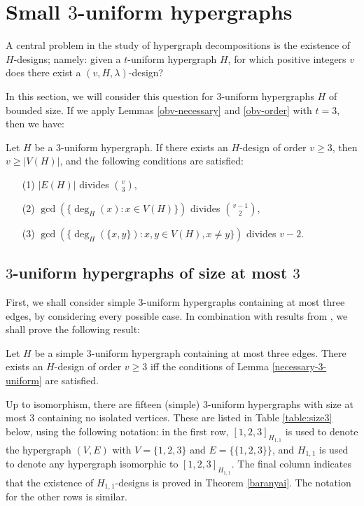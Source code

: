 \section{Small $3$-uniform hypergraphs} \label{section:small-h}

A central problem in the study of hypergraph decompositions is the existence of
$H$-designs; namely: given a $t$-uniform hypergraph $H$, for which positive
integers $v$ does there exist a $(v, H, \lambda)$-design?

In this section, we will consider this question for $3$-uniform hypergraphs $H$ of bounded size.
If we apply Lemmas \ref{obv-necessary} and \ref{obv-order} with $t = 3$, then we have:

\begin{lemma} \label{necessary-3-uniform}
Let $H$ be a $3$-uniform hypergraph.
If there exists an $H$-design of order $v \geq 3$, then $v \geq |V(H)|$, and the following conditions are satisfied:
\begin{enumerate}
    \item[(1)] $|E(H)|$ divides ${v \choose 3}$,
    \item[(2)] $\gcd(\{\deg_H(x) : x \in V(H)\})$ divides ${v-1 \choose 2}$,
    \item[(3)] $\gcd(\{\deg_H(\{x,y\}) : x, y \in V(H), x \neq y\})$ divides $v-2$.
\end{enumerate}
\end{lemma}

\subsection{$3$-uniform hypergraphs of size at most $3$}

First, we shall consider simple $3$-uniform hypergraphs containing at most three edges, by considering every possible case.
In combination with results from \cite{baran, bryant, feng-chang2, hanani}, we shall prove the following result:

\begin{theorem}
Let $H$ be a simple $3$-uniform hypergraph containing at most three edges.
There exists an $H$-design of order $v \geq 3$ iff the conditions of Lemma \ref{necessary-3-uniform} are satisfied.
\end{theorem}

Up to isomorphism, there are fifteen (simple) $3$-uniform hypergraphs with size at most 3 containing no isolated vertices.
These are listed in Table \ref{table:size3} below, using the following notation: in the first row, $[1, 2, 3]_{H_{1,1}}$ is used to denote the hypergraph $(V, E)$ with $V = \{1, 2, 3\}$ and $E = \{\{1, 2, 3\}\}$, and $H_{1,1}$ is used to denote any hypergraph isomorphic to $[1, 2, 3]_{H_{1,1}}$.
The final column indicates that the existence of $H_{1,1}$-designs is proved in Theorem \ref{baranyai}.
The notation for the other rows is similar.

